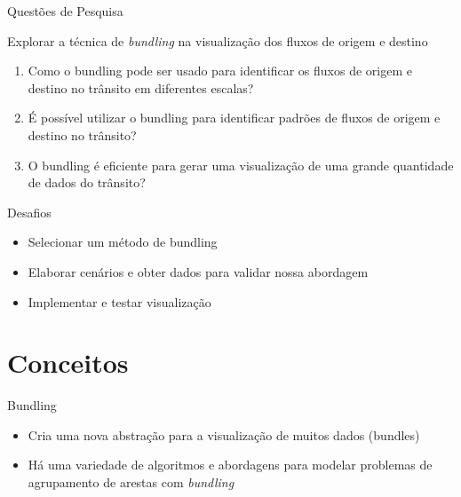 \begin{frame}{Questões de Pesquisa}
  \begin{block}{Explorar a técnica de \emph{bundling} na visualização dos fluxos de origem e destino}
    \begin{enumerate}
      \pause
      \item Como o bundling pode ser usado para identificar os fluxos de origem
      e destino no trânsito em diferentes escalas?

      \pause
      \item É possível utilizar o bundling para identificar padrões de fluxos
      de origem e destino no trânsito?

      \pause
      \item O bundling é eficiente para gerar uma visualização de uma grande
      quantidade de dados do trânsito?
    \end{enumerate}
  \end{block}
\end{frame}

\begin{frame}{Desafios}
    \begin{itemize}
      \item Selecionar um método de bundling

      \item Elaborar cenários e obter dados para validar nossa abordagem

      \item Implementar e testar visualização
    \end{itemize}
\end{frame}

\section{Conceitos}

\begin{frame}{Bundling}
  \begin{itemize}
    \item Cria uma nova abstração para a visualização de muitos dados (bundles)

    \item Há uma variedade de algoritmos e abordagens para modelar problemas de
  agrupamento de arestas com \emph{bundling}
  \end{itemize}
\end{frame}

